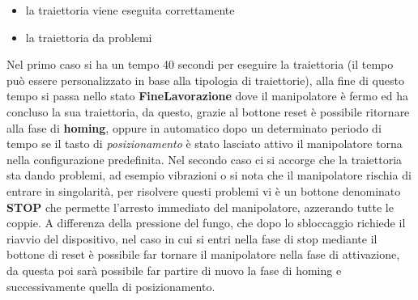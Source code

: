 \begin{itemize}
	\item la traiettoria viene eseguita correttamente
	\item la traiettoria da problemi
\end{itemize}
Nel primo caso si ha un tempo 40 secondi per eseguire la traiettoria (il tempo può essere personalizzato in base alla tipologia di traiettorie), alla fine di questo tempo si passa nello stato \textbf{FineLavorazione} dove il manipolatore è fermo ed ha concluso la sua traiettoria, da questo, grazie al bottone reset è possibile ritornare alla fase di \textbf{homing}, oppure in automatico dopo un determinato periodo di tempo se il tasto di \textit{posizionamento} è stato lasciato attivo il manipolatore torna nella configurazione predefinita. Nel secondo caso ci si accorge che la traiettoria sta dando problemi, ad esempio vibrazioni o si nota che il manipolatore rischia di entrare in singolarità, per risolvere questi problemi vi è un bottone denominato \textbf{STOP} che permette l'arresto immediato del manipolatore, azzerando tutte le coppie. A differenza della pressione del fungo, che dopo lo sbloccaggio richiede il riavvio del dispositivo, nel caso in cui si entri nella fase di stop mediante il bottone di reset è possibile far tornare il manipolatore nella fase di attivazione, da questa poi sarà possibile far partire di nuovo la fase di homing e successivamente quella di posizionamento.
